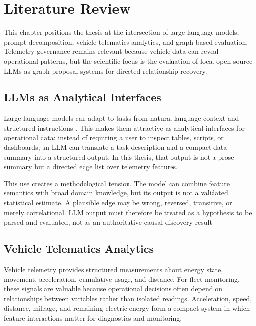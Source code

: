 \chapter{Literature Review}
\label{sec:background}

This chapter positions the thesis at the intersection of large language
models, prompt decomposition, vehicle telematics analytics, and graph-based
evaluation. Telemetry governance remains relevant because vehicle data can
reveal operational patterns, but the scientific focus is the evaluation of
local open-source LLMs as graph proposal systems for directed relationship
recovery.


\section{LLMs as Analytical Interfaces}

Large language models can adapt to tasks from natural-language context and
structured instructions \parencite{brown2020language}. This makes them
attractive as analytical interfaces for operational data: instead of requiring
a user to inspect tables, scripts, or dashboards, an LLM can translate a task
description and a compact data summary into a structured output. In this
thesis, that output is not a prose summary but a directed edge list over
telemetry features.

This use creates a methodological tension. The model can combine feature
semantics with broad domain knowledge, but its output is not a validated
statistical estimate. A plausible edge may be wrong, reversed, transitive, or
merely correlational. LLM output must therefore be treated as a hypothesis to
be parsed and evaluated, not as an authoritative causal discovery result.

\section{Vehicle Telematics Analytics}

Vehicle telemetry provides structured measurements about energy state,
movement, acceleration, cumulative usage, and distance. For fleet monitoring,
these signals are valuable because operational decisions often depend on
relationships between variables rather than isolated readings. Acceleration,
speed, distance, mileage, and remaining electric energy form a compact system
in which feature interactions matter for diagnostics and monitoring.

